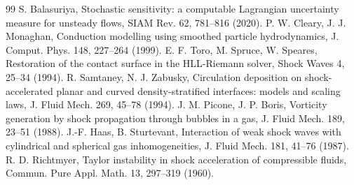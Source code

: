 \documentclass[11pt]{article}
\theoremstyle{definition}\newtheorem{definition}{Definition}\theoremstyle{remark}\newtheorem{remark}{Remark}
\begin{document}
\begin{thebibliography}{99}
 S. Balasuriya, Stochastic sensitivity: a computable Lagrangian uncertainty measure for unsteady flows, SIAM Rev. 62, 781--816 (2020).
 P. W. Cleary, J. J. Monaghan, Conduction modelling using smoothed particle hydrodynamics, J. Comput. Phys. 148, 227--264 (1999).
 E. F. Toro, M. Spruce, W. Speares, Restoration of the contact surface in the HLL-Riemann solver, Shock Waves 4, 25--34 (1994).
 R. Samtaney, N. J. Zabusky, Circulation deposition on shock-accelerated planar and curved density-stratified interfaces: models and scaling laws, J. Fluid Mech. 269, 45--78 (1994).
 J. M. Picone, J. P. Boris, Vorticity generation by shock propagation through bubbles in a gas, J. Fluid Mech. 189, 23--51 (1988).
 J.-F. Haas, B. Sturtevant, Interaction of weak shock waves with cylindrical and spherical gas inhomogeneities, J. Fluid Mech. 181, 41--76 (1987).
 R. D. Richtmyer, Taylor instability in shock acceleration of compressible fluids, Commun. Pure Appl. Math. 13, 297--319 (1960).
\end{thebibliography}
\end{document}
